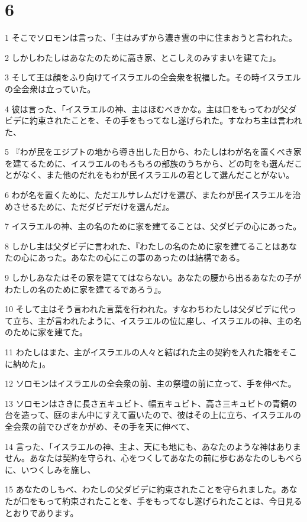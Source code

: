 \chapter{6}

\par 1 そこでソロモンは言った、「主はみずから濃き雲の中に住まおうと言われた。
\par 2 しかしわたしはあなたのために高き家、とこしえのみすまいを建てた」。
\par 3 そして王は顔をふり向けてイスラエルの全会衆を祝福した。その時イスラエルの全会衆は立っていた。
\par 4 彼は言った、「イスラエルの神、主はほむべきかな。主は口をもってわが父ダビデに約束されたことを、その手をもってなし遂げられた。すなわち主は言われた、
\par 5 『わが民をエジプトの地から導き出した日から、わたしはわが名を置くべき家を建てるために、イスラエルのもろもろの部族のうちから、どの町をも選んだことがなく、また他のだれをもわが民イスラエルの君として選んだことがない。
\par 6 わが名を置くために、ただエルサレムだけを選び、またわが民イスラエルを治めさせるために、ただダビデだけを選んだ』。
\par 7 イスラエルの神、主の名のために家を建てることは、父ダビデの心にあった。
\par 8 しかし主は父ダビデに言われた、『わたしの名のために家を建てることはあなたの心にあった。あなたの心にこの事のあったのは結構である。
\par 9 しかしあなたはその家を建ててはならない。あなたの腰から出るあなたの子がわたしの名のために家を建てるであろう』。
\par 10 そして主はそう言われた言葉を行われた。すなわちわたしは父ダビデに代って立ち、主が言われたように、イスラエルの位に座し、イスラエルの神、主の名のために家を建てた。
\par 11 わたしはまた、主がイスラエルの人々と結ばれた主の契約を入れた箱をそこに納めた」。
\par 12 ソロモンはイスラエルの全会衆の前、主の祭壇の前に立って、手を伸べた。
\par 13 ソロモンはさきに長さ五キュビト、幅五キュビト、高さ三キュビトの青銅の台を造って、庭のまん中にすえて置いたので、彼はその上に立ち、イスラエルの全会衆の前でひざをかがめ、その手を天に伸べて、
\par 14 言った、「イスラエルの神、主よ、天にも地にも、あなたのような神はありません。あなたは契約を守られ、心をつくしてあなたの前に歩むあなたのしもべらに、いつくしみを施し、
\par 15 あなたのしもべ、わたしの父ダビデに約束されたことを守られました。あなたが口をもって約束されたことを、手をもってなし遂げられたことは、今日見るとおりであります。
